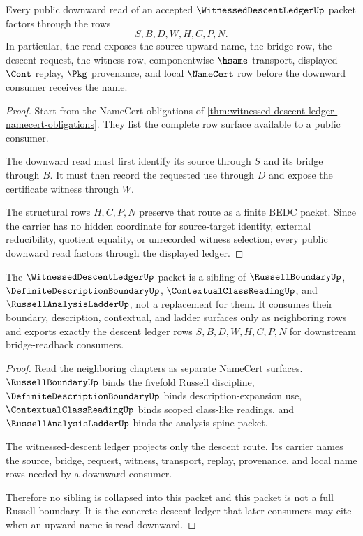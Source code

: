 \begin{theorem}
\label{thm:witnessed-descent-ledger-public-readback}
Every public downward read of an accepted $\WitnessedDescentLedgerUp$ packet factors through the rows
$$
S,B,D,W,H,C,P,N.
$$
In particular, the read exposes the source upward name, the bridge row, the descent request, the witness row, componentwise $\hsame$ transport, displayed $\Cont$ replay, $\Pkg$ provenance, and local $\NameCert$ row before the downward consumer receives the name.
\end{theorem}
\begin{proof}
Start from the NameCert obligations of \autoref{thm:witnessed-descent-ledger-namecert-obligations}. They list the complete row surface available to a public consumer.

The downward read must first identify its source through $S$ and its bridge through $B$. It must then record the requested use through $D$ and expose the certificate witness through $W$.

The structural rows $H,C,P,N$ preserve that route as a finite BEDC packet. Since the carrier has no hidden coordinate for source-target identity, external reducibility, quotient equality, or unrecorded witness selection, every public downward read factors through the displayed ledger.
\end{proof}

\begin{theorem}
\label{thm:witnessed-descent-ledger-sibling-boundary}
The $\WitnessedDescentLedgerUp$ packet is a sibling of $\RussellBoundaryUp$, $\DefiniteDescriptionBoundaryUp$, $\ContextualClassReadingUp$, and $\RussellAnalysisLadderUp$, not a replacement for them. It consumes their boundary, description, contextual, and ladder surfaces only as neighboring rows and exports exactly the descent ledger rows $S,B,D,W,H,C,P,N$ for downstream bridge-readback consumers.
\end{theorem}
\begin{proof}
Read the neighboring chapters as separate NameCert surfaces. $\RussellBoundaryUp$ binds the fivefold Russell discipline, $\DefiniteDescriptionBoundaryUp$ binds description-expansion use, $\ContextualClassReadingUp$ binds scoped class-like readings, and $\RussellAnalysisLadderUp$ binds the analysis-spine packet.

The witnessed-descent ledger projects only the descent route. Its carrier names the source, bridge, request, witness, transport, replay, provenance, and local name rows needed by a downward consumer.

Therefore no sibling is collapsed into this packet and this packet is not a full Russell boundary. It is the concrete descent ledger that later consumers may cite when an upward name is read downward.
\end{proof}

